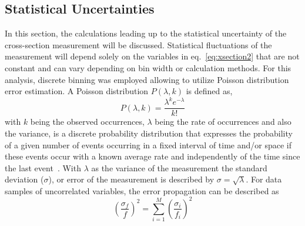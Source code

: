 \subsection{Statistical Uncertainties}\label{sec:results.staterrors}

In this section, the calculations leading up to the statistical uncertainty of the cross-section measurement will be discussed. Statistical fluctuations of the measurement will depend solely on the variables in eq.~\ref{eq:xsection2} that are not constant and can vary depending on bin width or calculation methods. For this analysis, discrete binning was employed allowing to utilize Poisson distribution error estimation. A Poisson distribution $P(\lambda,k)$ is defined as,
\begin{equation}
P(\lambda,k) = \frac{\lambda^k e^{-\lambda}}{k!}
\end{equation}
with $k$ being the observed occurrences, $\lambda$ being the rate of occurrences and also the variance, is a discrete probability distribution that expresses the probability of a given number of events occurring in a fixed interval of time and/or space if these events occur with a known average rate and independently of the time since the last event~\cite{Poisson}. With $\lambda$ as the variance of the measurement the standard deviation ($\sigma$), or error of the measurement is described by $\sigma = \sqrt{\lambda}$. 
For data samples of uncorrelated variables, the error propagation can be described as
\begin{equation}
\left(\frac{\sigma_f}{f}\right)^2 = \sum_{i=1}^{M}\left(\frac{\sigma_i}{f_i}\right)^2
\end{equation}

